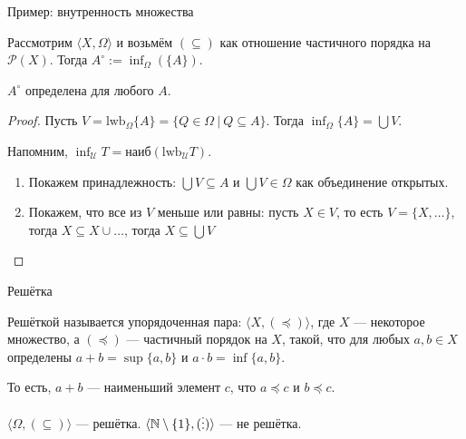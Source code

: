 \documentclass[aspectratio=169]{beamer}
\begin{document}
\begin{frame}{Пример: внутренность множества}
\begin{defrus} Рассмотрим $\langle X, \Omega\rangle$ и возьмём $(\subseteq)$ как отношение частичного порядка на $\mathcal{P}(X)$.
Тогда $A^\circ := \inf_\Omega (\{ A\})$. %
\end{defrus}

\begin{thmrus}$A^\circ$ определена для любого $A$.\end{thmrus}
\begin{proof}

Пусть $V = \text{lwb}_\Omega\{ A \} = \{ Q \in \Omega\ |\ Q \subseteq A\}$. Тогда $\inf_\Omega \{A\} = \bigcup V$.

Напомним, $\inf_\mathcal{U} T = \text{наиб}(\text{lwb}_\mathcal{U} T)$.

\begin{enumerate}
\item Покажем принадлежность: $\bigcup V \subseteq A$ и $\bigcup V \in \Omega$ как объединение открытых.
\item Покажем, что все из $V$ меньше или равны: пусть $X \in V$, то есть $V = \{ X, \dots \}$, тогда $X \subseteq X \cup \dots$, тогда $X \subseteq \bigcup V$
\end{enumerate}
\end{proof}
\end{frame}

\begin{frame}{Решётка}
\begin{defrus}Решёткой называется упорядоченная пара: $\langle X, (\preceq)\rangle$, 
где $X$ --- некоторое множество, а $(\preceq)$ --- частичный порядок на $X$, такой, 
что для любых $a,b \in X$ определены $a + b = \sup\{a,b\}$ и $a \cdot b = \inf\{a,b\}$.
\end{defrus}

То есть, $a + b$ --- наименьший элемент $c$, что $a \preceq c$ и $b \preceq c$.

\begin{exmprus}
$\langle\Omega, (\subseteq)\rangle$ --- решётка.
$\langle\mathbb{N}\setminus\{1\}, (\raisebox{-0.75pt}{\vdots})\rangle$ --- не решётка.
\end{exmprus}
\end{frame}
\end{document}
